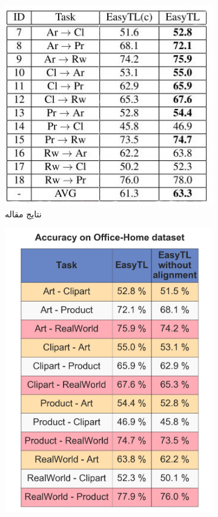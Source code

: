 \begin{figure}[H]
	\centering
	\begin{subfigure}[b]{0.2\textwidth}
		\centering
		\includegraphics[width=\linewidth]{images/4_4.jpg}
		\caption{نتایج مقاله}
	\end{subfigure}%
	\begin{subfigure}[b]{0.2\textwidth}
		\centering
		\includegraphics[width=\linewidth]{images/4_1.jpg}

\end{subfigure}
\end{figure}
